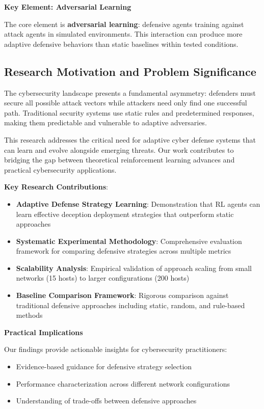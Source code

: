 \documentclass[12pt]{article}
\theoremstyle{definition}
\theoremstyle{plain}
\begin{document}
\textbf{Key Element: Adversarial Learning}

The core element is \textbf{adversarial learning}: defensive agents training against attack agents in simulated environments. This interaction can produce more adaptive defensive behaviors than static baselines within tested conditions.

\subsection{Research Motivation and Problem Significance}

The cybersecurity landscape presents a fundamental asymmetry: defenders must secure all possible attack vectors while attackers need only find one successful path. Traditional security systems use static rules and predetermined responses, making them predictable and vulnerable to adaptive adversaries.

This research addresses the critical need for adaptive cyber defense systems that can learn and evolve alongside emerging threats. Our work contributes to bridging the gap between theoretical reinforcement learning advances and practical cybersecurity applications.

\textbf{Key Research Contributions}:
\begin{itemize}
    \item \textbf{Adaptive Defense Strategy Learning}: Demonstration that RL agents can learn effective deception deployment strategies that outperform static approaches
    \item \textbf{Systematic Experimental Methodology}: Comprehensive evaluation framework for comparing defensive strategies across multiple metrics
    \item \textbf{Scalability Analysis}: Empirical validation of approach scaling from small networks (15 hosts) to larger configurations (200 hosts)
    \item \textbf{Baseline Comparison Framework}: Rigorous comparison against traditional defensive approaches including static, random, and rule-based methods
\end{itemize}

\textbf{Practical Implications}

Our findings provide actionable insights for cybersecurity practitioners:
\begin{itemize}
    \item Evidence-based guidance for defensive strategy selection
    \item Performance characterization across different network configurations
    \item Understanding of trade-offs between defensive approaches
\end{itemize}
\end{document}

